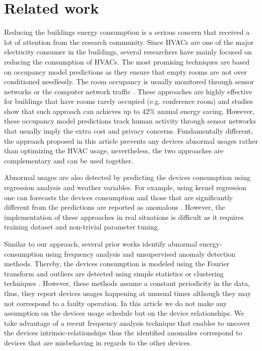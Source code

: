 \section{Related work}
Reducing the buildings energy consumption is a serious concern that received a lot of attention from the research community.
Since HVACs are one of the major electricity consumer in the buildings, several researchers have mainly focused on reducing the consumption of HVACs.
The most promising techniques are based on occupancy model predictions as they ensure that empty rooms are not over conditioned needlessly.
The room occupancy is usually monitored through sensor networks \cite{agarwal:ipsn2011,erickson:ipsn2011} or the computer network traffic \cite{kim:buildsys2010}.
These approaches are highly effective for buildings that have rooms rarely occupied (e.g. conference room) and studies show that such approach can achieves up to 42\% annual energy saving.
However, these occupancy model predictions track human activity through sensor networks that usually imply the extra cost and privacy concerns.
Fundamentally different, the approach proposed in this article prevents any devices abnormal usages rather than optimizing the HVAC usage, nevertheless, the two approaches are complementary and can be used together.

Abnormal usages are also detected by predicting the devices consumption using regression analysis and weather variables.
For example, using kernel regression one can forecasts the devices consumption and those that are significantly different from the predictions are reported as anomalous \cite{brown:buildperf2012}.
However, the implementation of these approaches in real situations is difficult as it requires training dataset and non-trivial parameter tuning.

Similar to our approach, several prior works identify abnormal energy-consumption using frequency analysis and unsupervised anomaly detection methods.
Thereby, the devices consumption is modeled using the Fourier transform and outliers are detected using simple statistics \cite{li:ieee2010} or clustering techniques \cite{Bellala_buildsys11,wrinch:pes2012,jakkula,chen:aaaiw2011}.
However, these methods assume a constant periodicity in the data, thus, they report devices usages happening at unusual times although they may not correspond to a faulty operation.
In this article we do not make any assumption on the devices usage schedule but on the device relationships.
We take advantage of a recent frequency analysis technique that enables to uncover the devices intrinsic-relationships \cite{romain:iotapp12} thus the identified anomalies correspond to devices that are misbehaving in regards to the other devices.

